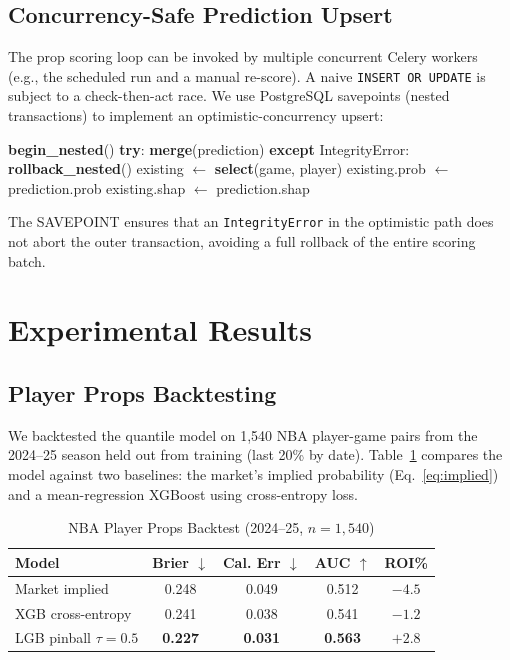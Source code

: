 \documentclass[conference]{IEEEtran}
\begin{document}
\subsection{Concurrency-Safe Prediction Upsert}

The prop scoring loop can be invoked by multiple concurrent Celery
workers (e.g., the scheduled run and a manual re-score).  A naive
\texttt{INSERT OR UPDATE} is subject to a check-then-act race.
We use PostgreSQL savepoints (nested transactions) to implement
an optimistic-concurrency upsert:

\begin{algorithmic}[1]
  \State \textbf{begin\_nested}() 
  \State \textbf{try}: \textbf{merge}(prediction)
  \State \textbf{except} IntegrityError:
  \State \quad \textbf{rollback\_nested}()
  \State \quad existing $\leftarrow$ \textbf{select}(game, player)
  \State \quad existing.prob $\leftarrow$ prediction.prob
  \State \quad existing.shap $\leftarrow$ prediction.shap
\EndProcedure
\end{algorithmic}

The SAVEPOINT ensures that an \texttt{IntegrityError} in the optimistic
path does not abort the outer transaction, avoiding a full rollback of
the entire scoring batch.

\section{Experimental Results}
\label{sec:results}

\subsection{Player Props Backtesting}

We backtested the quantile model on 1,540 NBA player-game pairs
from the 2024--25 season held out from training (last 20\% by date).
Table~\ref{tab:props} compares the model against two baselines:
the market's implied probability (Eq.~\eqref{eq:implied}) and a
mean-regression XGBoost using cross-entropy loss.

\begin{table}[!t]
\caption{NBA Player Props Backtest (2024--25, $n=1{,}540$)}
\label{tab:props}
\centering
\begin{tabular}{lcccc}
\toprule
Model & Brier $\downarrow$ & Cal. Err $\downarrow$ & AUC $\uparrow$ & ROI\%\\
\midrule
Market implied     & 0.248 & 0.049 & 0.512 & $-4.5$\\
XGB cross-entropy  & 0.241 & 0.038 & 0.541 & $-1.2$\\
LGB pinball $\tau{=}0.5$ & \textbf{0.227} & \textbf{0.031} & \textbf{0.563} & $+2.8$\\
\bottomrule
\end{tabular}
\end{table}
\end{document}
